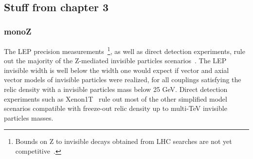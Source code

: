 







\subsection{Stuff from chapter 3}

\subsubsection{monoZ}


The LEP precision measurements~\footnote{Bounds on Z to invisible decays obtained from LHC searches are not yet competitive~\cite{deSimone:2014pda}.}, as well as direct detection experiments, rule out the majority of the Z-mediated invisible particles scenarios~\cite{Arcadi:2014lta,Escudero:2016gzx}. The LEP invisible width is well below the width one would expect if vector and axial vector models of invisible particles were realized, for all couplings satisfying the relic density with a invisible particles mass below 25 GeV. Direct detection experiments such as Xenon1T~\cite{Aprile:2017iyp} 
rule out most of the other simplified model scenarios compatible with freeze-out relic density up to multi-TeV invisible particles masses. 


